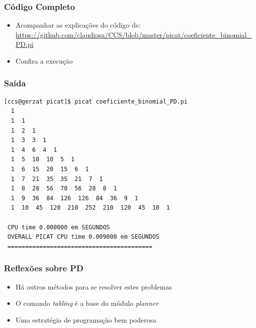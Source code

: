 \begin{frame}[fragile]
 \frametitle{Código Completo}

\begin{itemize}
  \item Acompanhar as explicações do código de:\\
\url{https://github.com/claudiosa/CCS/blob/master/picat/coeficiente_binomial_PD.pi}

  \item Confira a execuç\~ao
\end{itemize}
\end{frame}
\begin{frame}[fragile]

\frametitle{Saída}
\begin{footnotesize}
\begin{verbatim}
[ccs@gerzat picat]$ picat coeficiente_binomial_PD.pi 
  1 
  1  1 
  1  2  1 
  1  3  3  1 
  1  4  6  4  1 
  1  5  10  10  5  1 
  1  6  15  20  15  6  1 
  1  7  21  35  35  21  7  1 
  1  8  28  56  70  56  28  8  1 
  1  9  36  84  126  126  84  36  9  1 
  1  10  45  120  210  252  210  120  45  10  1 

 CPU time 0.000000 em SEGUNDOS 
 OVERALL PICAT CPU time 0.009000 em SEGUNDOS  
 =========================================
\end{verbatim}

\end{footnotesize}    

\end{frame}



\begin{frame}[fragile]
\frametitle{Reflexões sobre PD}


\begin{itemize}
  \item Há outros métodos para se resolver estes problemas

  \pause
  \item O comando \textit{tabling} é a base do módulo \textit{planner}

   \pause
  \item Uma estratégia de programação bem poderosa
\end{itemize}

\end{frame}

